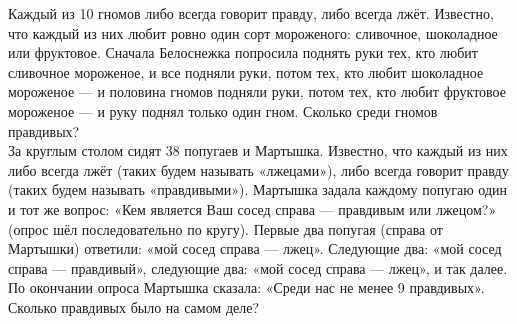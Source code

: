  Каждый из 10 гномов либо всегда говорит правду,
либо всегда лжёт. Известно, что каждый из них любит ровно один сорт мороженого: сливочное, шоколадное или фруктовое. Сначала Белоснежка попросила поднять руки тех, кто любит
сливочное мороженое, и все подняли руки, потом тех, кто любит шоколадное мороженое — и
половина гномов подняли руки, потом тех, кто любит фруктовое мороженое — и руку поднял
только один гном. Сколько среди гномов правдивых?\\



 За круглым столом сидят 38 попугаев и Мартышка. Известно,
что каждый из них либо всегда лжёт (таких будем называть «лжецами»), либо всегда говорит правду (таких будем называть «правдивыми»). Мартышка задала каждому попугаю один
и тот же вопрос: «Кем является Ваш сосед справа — правдивым или лжецом?» (опрос шёл
последовательно по кругу). Первые два попугая (справа от Мартышки) ответили: «мой сосед справа — лжец». Следующие два: «мой сосед справа — правдивый», следующие два: «мой
сосед справа — лжец», и так далее. По окончании опроса Мартышка сказала: «Среди нас не менее 9 правдивых». Сколько правдивых было на самом деле?

